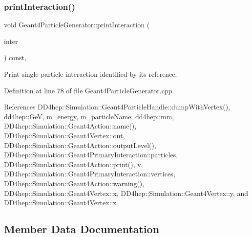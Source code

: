 \subsubsection{\texorpdfstring{print\+Interaction()}{printInteraction()}\hspace{0.1cm}{\footnotesize\ttfamily [2/2]}}
{\footnotesize\ttfamily void Geant4\+Particle\+Generator\+::print\+Interaction (\begin{DoxyParamCaption}\item[{\hyperlink{class_d_d4hep_1_1_simulation_1_1_geant4_primary_interaction}{Geant4\+Primary\+Interaction} $\ast$}]{inter }\end{DoxyParamCaption}) const\hspace{0.3cm}{\ttfamily [protected]}, {\ttfamily [virtual]}}



Print single particle interaction identified by it\textquotesingle{}s reference. 



Definition at line 78 of file Geant4\+Particle\+Generator.\+cpp.



References D\+D4hep\+::\+Simulation\+::\+Geant4\+Particle\+Handle\+::dump\+With\+Vertex(), dd4hep\+::\+GeV, m\+\_\+energy, m\+\_\+particle\+Name, dd4hep\+::mm, D\+D4hep\+::\+Simulation\+::\+Geant4\+Action\+::name(), D\+D4hep\+::\+Simulation\+::\+Geant4\+Vertex\+::out, D\+D4hep\+::\+Simulation\+::\+Geant4\+Action\+::output\+Level(), D\+D4hep\+::\+Simulation\+::\+Geant4\+Primary\+Interaction\+::particles, D\+D4hep\+::\+Simulation\+::\+Geant4\+Action\+::print(), v, D\+D4hep\+::\+Simulation\+::\+Geant4\+Primary\+Interaction\+::vertices, D\+D4hep\+::\+Simulation\+::\+Geant4\+Action\+::warning(), D\+D4hep\+::\+Simulation\+::\+Geant4\+Vertex\+::x, D\+D4hep\+::\+Simulation\+::\+Geant4\+Vertex\+::y, and D\+D4hep\+::\+Simulation\+::\+Geant4\+Vertex\+::z.



\subsection{Member Data Documentation}
\hypertarget{class_d_d4hep_1_1_simulation_1_1_geant4_particle_generator_a2e9c3184ff8999d4e55e3158e3b43727}{}\label{class_d_d4hep_1_1_simulation_1_1_geant4_particle_generator_a2e9c3184ff8999d4e55e3158e3b43727} 
